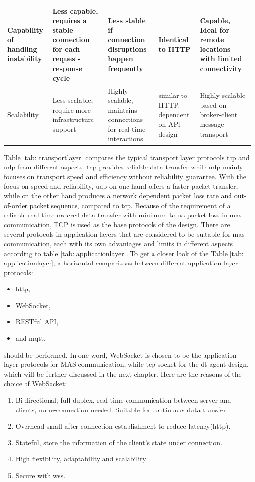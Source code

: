 \begin{table}
\begin{tabular}{|m{}|m{}|m{}|m{}|m{}|}
Capability of handling instability & Less capable, requires a stable connection for each request-response cycle & Less stable if connection disruptions happen frequently & Identical to HTTP & Capable, Ideal for remote locations with limited connectivity \\ \hline
Scalability & Less scalable, require more infrastructure support & Highly scalable, maintains connections for real-time interactions & similar to HTTP, dependent on API design & Highly scalable based on broker-client message transport \\ \hline
\end{tabular}
\end{table}


Table \ref{tab: transportlayer} compares the typical transport layer protocols \gls{tcp} and \gls{udp} from different aspects.  \gls{tcp} provides reliable data transfer while \gls{udp} mainly focuses on transport speed and efficiency without reliability guarantee. With the focus on speed and reliability, \gls{udp} on one hand offers a faster packet transfer, while on the other hand produces a network dependent packet loss rate and out-of-order packet sequence, compared to \gls{tcp}. Because of the requirement of a reliable real time ordered data transfer with minimum to no packet loss in \gls{mas} communication, TCP is used as the base protocols of the design. There are several protocols in application layers that are considered to be suitable for \gls{mas} communication, each with its own advantages and limits in different aspects according to table \ref{tab: applicationlayer}.
To get a closer look of the Table \ref{tab: applicationlayer},  a horizontal comparisons between different application layer protocols: 
\begin{itemize}
\item \gls{http},
\item WebSocket,
\item RESTful API,
\item and \gls{mqtt},
\end{itemize}
should be performed. In one word, WebSocket is chosen to be the application layer protocols for MAS communication, while \gls{tcp} socket for the \gls{dt} agent design, which will be further discussed in the next chapter. Here are the reasons of the choice of WebSocket: 
\begin{enumerate}
\item Bi-directional, full duplex, real time communication between server and clients, no re-connection needed. Suitable for continuous data transfer.
\item Overhead small after connection establishment to reduce latency(\gls{http}).
\item Stateful, store the information of the client's state under connection.
\item High flexibility, adaptability and scalability
\item Secure with wss.
\end{enumerate}

